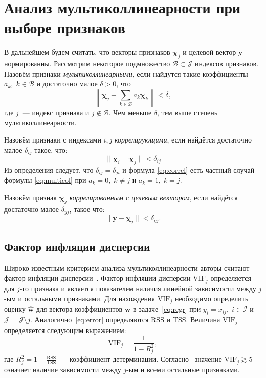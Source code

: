 \documentclass[a4paper,12pt]{article}
\newcommand{\bw}{\mathbf{w}}
\newcommand{\by}{\mathbf{y}}
\newcommand{\bchi}{\boldsymbol{\chi}}
\newcommand{\calJ}{\mathcal{J}}
\newcommand{\calI}{\mathcal{I}}
\newcommand{\vif}{\mathrm{VIF}}
\newcommand{\rss}{\mathrm{RSS}}
\newcommand{\tss}{\mathrm{TSS}}
\begin{document}
\section{Анализ мультиколлинеарности при выборе признаков}

В дальнейшем будем считать, что векторы признаков $\bchi_j$ и целевой вектор $\by$ нормированны. Рассмотрим некоторое подмножество $\mathcal{B} \subset \calJ$ индексов признаков.   Назовём признаки \emph{мультиколлинеарными}, если найдутся такие коэффициенты $a_k, \; k \in \mathcal{B}$ и достаточно малое $\delta > 0$, что 
\begin{equation}
\left \| \bchi_j - \sum\limits_{k \in \mathcal{B}} a_k \bchi_k \right \| < \delta,
\label{eq:multicol}
\end{equation}
где $j$~--- индекс признака и $j \not\in \mathcal{B} $. Чем меньше $\delta$, тем выше степень мультиколлинеарности. 

Назовём признаки с индексами $i, j$ \emph{коррелирующими}, если найдётся достаточно малое $\delta_{ij}$ такое, что:
\begin{equation}
\| \bchi_i - \bchi_j \| < \delta_{ij}
\label{eq:correl}
\end{equation}
Из определения следует, что $\delta_{ij} = \delta_{ji}$ и формула \eqref{eq:correl} есть частный случай формулы \eqref{eq:multicol} при $a_k = 0, \; k \neq j$ и $a_k = 1, \; k = j$.

Назовём признак $\bchi_j$ \emph{коррелированным с целевым вектором}, если найдётся достаточно малое $\delta_{yj}$, такое что:
\[
\| \by - \bchi_j \| < \delta_{yj}.
\]

\subsection{Фактор инфляции дисперсии}
Широко известным критерием анализа мультиколлинеарности авторы считают фактор инфляции дисперсии~\cite{multCausesEffectsRemedies}.  
Фактор инфляции дисперсии $\vif_j$ определяется для $j$-го признака и является показателем наличия линейной зависимости между $j$-ым и остальными признаками. Для нахождения $\vif_j$ необходимо определить оценку $\hat{\bw}$ для вектора коэффициентов $\bw$ в задаче~\eqref{eq:regr} при $y_i = x_{ij}, \; i \in \calI$ и $\calJ = \calJ \setminus j$. Аналогично~\eqref{eq:error} определяются $\rss$ и $\tss$.
Величина $\vif_j$ определяется следующим выражением:
\begin{equation*}
\vif_j = \frac{1}{1 - R^2_j},
\label{eq:vif}
\end{equation*}     
где $R^2_j = 1 - \frac{\rss}{\tss}$~--- коэффициент детерминации. Согласно~\cite{multCausesEffectsRemedies}  значение $\vif_j \gtrsim 5 $ означает наличие зависимости между $j$-ым и всеми остальные признаками.
\end{document}
